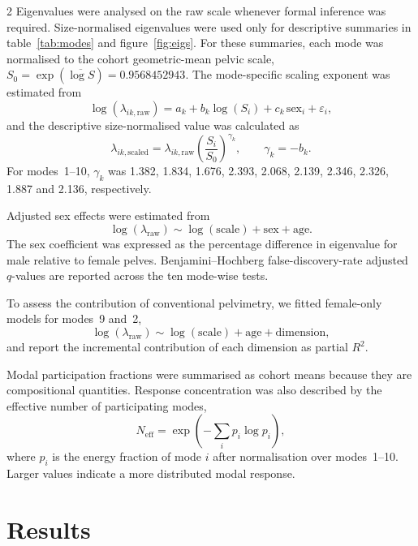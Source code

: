 \documentclass[openacc]{rsproca_new}
\begin{document}
\begin{multicols}{2}
Eigenvalues were analysed on the raw scale whenever formal inference was required. Size-normalised eigenvalues were used only for descriptive summaries in table~\ref{tab:modes} and figure~\ref{fig:eigs}. For these summaries, each mode was normalised to the cohort geometric-mean pelvic scale, $S_0=\exp(\overline{\log S})=0.9568452943$. The mode-specific scaling exponent was estimated from
\begin{equation}
\log(\lambda_{ik,\mathrm{raw}})=a_k+b_k\log(S_i)+c_k\,\mathrm{sex}_i+\varepsilon_i,
\end{equation}
and the descriptive size-normalised value was calculated as
\begin{equation}
\lambda_{ik,\mathrm{scaled}}=\lambda_{ik,\mathrm{raw}}\left(\frac{S_i}{S_0}\right)^{\gamma_k},
\qquad \gamma_k=-b_k.
\end{equation}
For modes~1--10, $\gamma_k$ was 1.382, 1.834, 1.676, 2.393, 2.068, 2.139, 2.346, 2.326, 1.887 and 2.136, respectively.

Adjusted sex effects were estimated from
\begin{equation}
\log(\lambda_{\mathrm{raw}}) \sim \log(\mathrm{scale}) + \mathrm{sex} + \mathrm{age}.
\end{equation}
The sex coefficient was expressed as the percentage difference in eigenvalue for male relative to female pelves. Benjamini--Hochberg false-discovery-rate adjusted $q$-values are reported across the ten mode-wise tests.

To assess the contribution of conventional pelvimetry, we fitted female-only models for modes~9 and~2,
\begin{equation}
\log(\lambda_{\mathrm{raw}}) \sim \log(\mathrm{scale}) + \mathrm{age} + \mathrm{dimension},
\end{equation}
and report the incremental contribution of each dimension as partial $R^2$.

Modal participation fractions were summarised as cohort means because they are compositional quantities. Response concentration was also described by the effective number of participating modes,
\begin{equation}
N_{\mathrm{eff}} = \exp\left(-\sum_i p_i\log p_i\right),
\end{equation}
where $p_i$ is the energy fraction of mode $i$ after normalisation over modes~1--10. Larger values indicate a more distributed modal response.

\section{Results}

\end{multicols}
\end{document}
